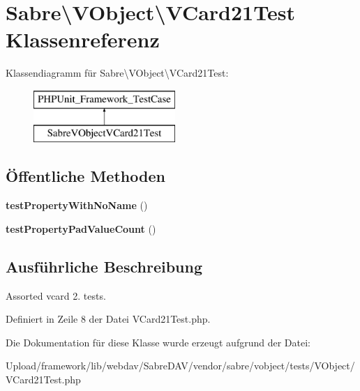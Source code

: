 \hypertarget{class_sabre_1_1_v_object_1_1_v_card21_test}{}\section{Sabre\textbackslash{}V\+Object\textbackslash{}V\+Card21\+Test Klassenreferenz}
\label{class_sabre_1_1_v_object_1_1_v_card21_test}
Klassendiagramm für Sabre\textbackslash{}V\+Object\textbackslash{}V\+Card21\+Test\+:\begin{figure}[H]
\begin{center}
\leavevmode
\includegraphics[height=2.000000cm]{class_sabre_1_1_v_object_1_1_v_card21_test}
\end{center}
\end{figure}
\subsection*{Öffentliche Methoden}
\begin{DoxyCompactItemize}
\item 
\mbox{\label{class_sabre_1_1_v_object_1_1_v_card21_test_a54f78f2130bfbd8e841ee4495232e843}} 
{\bfseries test\+Property\+With\+No\+Name} ()
\item 
\mbox{\label{class_sabre_1_1_v_object_1_1_v_card21_test_a2cf9cfb4ba45829c4e1f5a831218569d}} 
{\bfseries test\+Property\+Pad\+Value\+Count} ()
\end{DoxyCompactItemize}


\subsection{Ausführliche Beschreibung}
Assorted vcard 2. tests. 

Definiert in Zeile 8 der Datei V\+Card21\+Test.\+php.



Die Dokumentation für diese Klasse wurde erzeugt aufgrund der Datei\+:\begin{DoxyCompactItemize}
\item 
Upload/framework/lib/webdav/\+Sabre\+D\+A\+V/vendor/sabre/vobject/tests/\+V\+Object/V\+Card21\+Test.\+php\end{DoxyCompactItemize}
